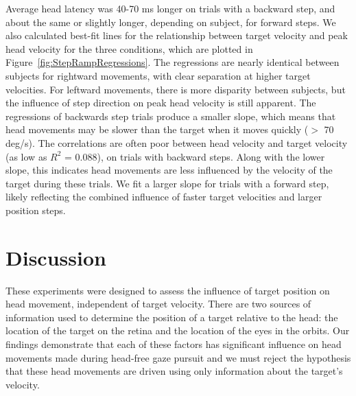 \documentclass[12pt]{article}
\begin{document}
Average head latency was 40-70 ms longer on trials with a backward step, and about the same or slightly longer, depending on subject, for forward steps. We also calculated best-fit lines for the relationship between target velocity and peak head velocity for the three conditions, which are plotted in Figure~\ref{fig:StepRampRegressions}. The regressions are nearly identical between subjects for rightward movements, with clear separation at higher target velocities. For leftward movements, there is more disparity between subjects, but the influence of step direction on peak head velocity is still apparent. The regressions of backwards step trials produce a smaller slope, which means that head movements may be slower than the target when it moves quickly ($>$ 70 deg/s). The correlations are often poor between head velocity and target velocity (as low as $R^{2}$ = 0.088), on trials with backward steps. Along with the lower slope, this indicates head movements are less influenced by the velocity of the target during these trials. We fit a larger slope for trials with a forward step, likely reflecting the combined influence of faster target velocities and larger position steps.
\clearpage


\section{Discussion}
These experiments were designed to assess the influence of target position on head movement, independent of target velocity. There are two sources of information used to determine the position of a target relative to the head: the location of the target on the retina and the location of the eyes in the orbits. Our findings demonstrate that each of these factors has significant influence on head movements made during head-free gaze pursuit and we must reject the hypothesis that these head movements are driven using only information about the target's velocity. 
\end{document}
